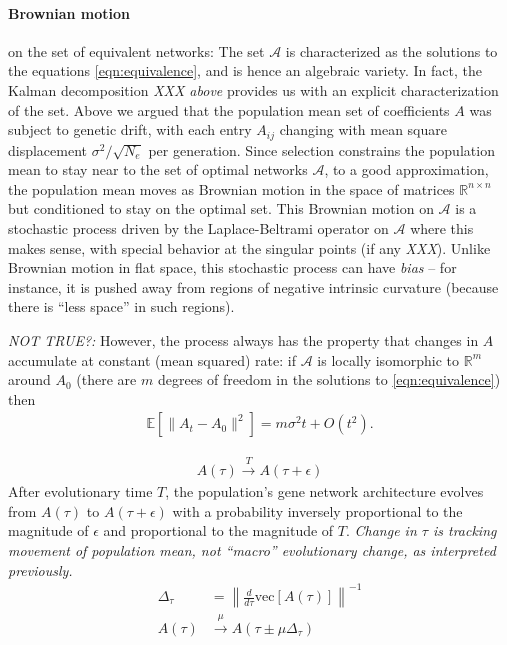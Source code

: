 \documentclass[9 pt]{article}
\newcommand{\plr}[1]{{\color{blue}\it #1}}
\newcommand{\jss}[1]{{\color{olive}\it #1}}
\newcommand{\R}{\mathbb{R}}
\newcommand{\E}{\mathbb{E}}
\newcommand{\calA}{\mathcal{A}}
\newcommand{\1}{\mathbbm{1}}
\begin{document}
  \paragraph{Brownian motion} on the set of equivalent networks:
  The set $\calA$ is characterized as the solutions to the equations \eqref{eqn:equivalence},
  and is hence an algebraic variety. 
  In fact, the Kalman decomposition \plr{XXX above} provides us with an explicit characterization of the set.
  Above we argued that the population mean set of coefficients $A$ was subject to genetic drift, 
  with each entry $A_{ij}$ changing with mean square displacement $\sigma^2/\sqrt{N_e}$ per generation.
  Since selection constrains the population mean to stay near to the set of optimal networks $\calA$,
  to a good approximation, the population mean moves as Brownian motion in the space of matrices $\R^{n \times n}$
  but conditioned to stay on the optimal set.
  This Brownian motion on $\calA$ is a stochastic process driven by the Laplace-Beltrami operator on $\calA$
  where this makes sense, with special behavior at the singular points (if any \plr{XXX}).
  Unlike Brownian motion in flat space, this stochastic process can have \emph{bias} --
  for instance, it is pushed away from regions of negative intrinsic curvature
  (because there is ``less space'' in such regions).

  \plr{NOT TRUE?:}
  However, the process always has the property that
  changes in $A$ accumulate at constant (mean squared) rate:
  if $\calA$ is locally isomorphic to $\R^m$ around $A_0$
  (there are $m$ degrees of freedom in the solutions to \eqref{eqn:equivalence}) then
  \begin{align}
      \E\left[ \|A_t - A_0\|^2 \right] = m \sigma^2 t + O(t^2) .
  \end{align}


  \begin{align}
    A(\tau) \xrightarrow{T} A(\tau + \epsilon)
  \end{align}
  After evolutionary time $T$, the population's gene network architecture evolves from $A(\tau)$ to $A(\tau + \epsilon)$ with a probability inversely proportional to the magnitude of $\epsilon$ and proportional to the magnitude of $T$. 
\jss{Change in $\tau$ is tracking movement of population mean, not ``macro'' evolutionary change, as interpreted previously.}
  \begin{align}
    \Delta_{\tau} &= \left\lVert \frac{d}{d \tau} \text{vec} \left[A\left(\tau\right)\right] \right\rVert^{-1} \\
    A(\tau) &\xrightarrow{\mu} A(\tau \pm \mu \Delta_{\tau})
  \end{align}
      
\end{document}
